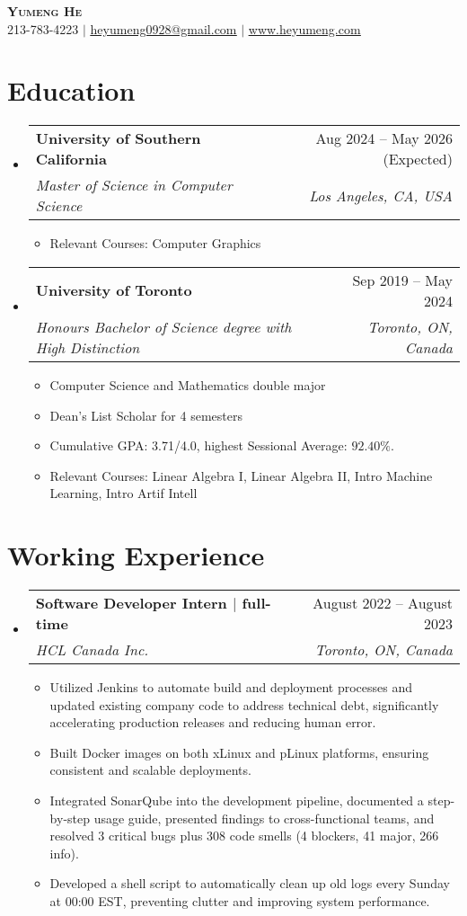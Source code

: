 \documentclass[letterpaper,11pt]{article}
\newcommand{\resumeItem}[1]{
  \item\small{
    {#1 \vspace{-2pt}}
  }
}
\newcommand{\resumeSubheading}[4]{
  \vspace{-2pt}\item
    \begin{tabularx}{\textwidth}[t]{X r}
      \textbf{#1} & #2 \\
      \textit{\small#3} & \textit{\small #4} \\
    \end{tabularx}\vspace{-7pt}
}
\newcommand{\resumeSubHeadingListStart}{\begin{itemize}[leftmargin=0in, label={}]}
\newcommand{\resumeSubHeadingListEnd}{\end{itemize}}
\newcommand{\resumeItemListStart}{\begin{itemize}}
\newcommand{\resumeItemListEnd}{\end{itemize}\vspace{-5pt}}
\begin{document}

\begin{center}
    \textbf{\Huge \scshape Yumeng He} \\ \vspace{1pt}
    \small 213-783-4223 $|$ \href{mailto:heyumeng@usc.edu}{\underline{heyumeng0928@gmail.com}} $|$ 
    \href{https://www.heyumeng.com} 
    {\underline{www.heyumeng.com}}
\end{center}


\section{Education}
  \resumeSubHeadingListStart
    \resumeSubheading
      {University of Southern California}{Aug 2024 -- May 2026 (Expected)}
      {Master of Science in Computer Science}{Los Angeles, CA, USA}
      \resumeItemListStart
        \resumeItem{Relevant Courses: Computer Graphics}
      \resumeItemListEnd
    \resumeSubheading
      {University of Toronto}{Sep 2019 -- May 2024}
      {Honours Bachelor of Science degree with High Distinction}{Toronto, ON, Canada}
      \resumeItemListStart
        \resumeItem{Computer Science and Mathematics double major}
        \resumeItem{Dean's List Scholar for 4 semesters}
        \resumeItem{Cumulative GPA: 3.71/4.0, highest Sessional Average: $92.40\%$.}
        \resumeItem{Relevant Courses: Linear Algebra I, Linear Algebra II, Intro Machine Learning, Intro Artif Intell}
      \resumeItemListEnd
  \resumeSubHeadingListEnd


\section{Working Experience}
  \resumeSubHeadingListStart
    \resumeSubheading
      {Software Developer Intern $|$ \normalfont full-time}{August 2022 – August 2023}
      {HCL Canada Inc.}{Toronto, ON, Canada}
      \resumeItemListStart
        \resumeItem{Utilized Jenkins to automate build and deployment processes and updated existing company code to address technical debt, significantly accelerating production releases and reducing human error.}
        \resumeItem{Built Docker images on both xLinux and pLinux platforms, ensuring consistent and scalable deployments.}
        \resumeItem{Integrated SonarQube into the development pipeline, documented a step-by-step usage guide, presented findings to cross-functional teams, and resolved 3 critical bugs plus 308 code smells (4 blockers, 41 major, 266 info).}
        \resumeItem{Developed a shell script to automatically clean up old logs every Sunday at 00:00 EST, preventing clutter and improving system performance.}
      \resumeItemListEnd
    \resumeSubHeadingListEnd
\end{document}
